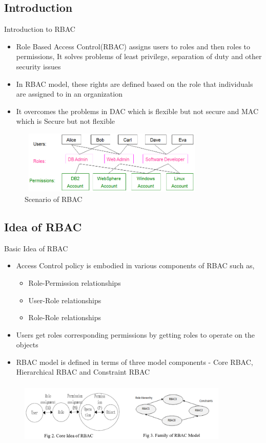 \documentclass[xcolor=dvipsnames]{beamer}
\begin{document}
\subsection{Introduction}
\begin{frame}{Introduction to RBAC}
\begin{itemize}
 \item Role Based Access Control(RBAC) assigns users to roles and then roles to permissions, It solves problems of least privilege, separation of duty and other security issues
 \item In RBAC model, these rights are defined based on the role that individuals are assigned to in an organization
 \item It overcomes the problems in DAC which is flexible but not secure and MAC which is Secure but not flexible
\end{itemize}
\begin{figure}[H]
\includegraphics[width=9cm,height=3cm]{sunny1}
\caption{Scenario of RBAC\label{fig:Scenario of RBAC}}
\end{figure}
\end{frame}

\subsection{Idea of RBAC}
\begin{frame}{Basic Idea of RBAC}
\begin{itemize}
	\item  Access Control policy is embodied in various components of RBAC such as,
	\begin{itemize}
	\item Role-Permission relationships
	\item User-Role relationships
	\item Role-Role relationships
	\end{itemize}
	\item Users get roles corresponding permissions by getting roles to operate on the objects
	\item RBAC model is defined in terms of three model components - Core RBAC, Hierarchical RBAC and Constraint RBAC
\end{itemize}
\begin{figure}[H]
\includegraphics[width=10cm,height=3cm]{sunny2_r}
\end{figure}
\end{frame}
\end{document}
